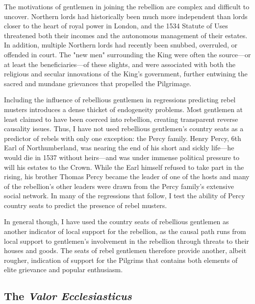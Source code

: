 \documentclass[12pt]{article}
\begin{document}
The motivations of gentlemen in joining the rebellion are complex and difficult to uncover. Northern lords had historically been much more independent than lords closer to the heart of royal power in London, and the 1534 Statute of Uses threatened both their incomes and the autonomous management of their estates.\autocite[27]{Fletcher2008} In addition, multiple Northern lords had recently been snubbed, overruled, or offended in court. The "new men" surrounding the King were often the source---or at least the beneficiaries---of these slights, and were associated with both the religious and secular innovations of the King's government, further entwining the sacred and mundane grievances that propelled the Pilgrimage.\autocite[69]{Bush1996}

Including the influence of rebellious gentlemen in regressions predicting rebel musters introduces a dense thicket of endogeneity problems. Most gentlemen at least claimed to have been coerced into rebellion, creating transparent reverse causality issues. Thus, I have not used rebellious gentlemen's country seats as a predictor of rebels with only one exception: the Percy family. Henry Percy, 6th Earl of Northumberland, was nearing the end of his short and sickly life---he would die in 1537 without heirs---and was under immense political pressure to will his estates to the Crown. While the Earl himself refused to take part in the rising, his brother Thomas Percy became the leader of one of the hosts and many of the rebellion's other leaders were drawn from the Percy family's extensive social network.\autocite[205-7]{Bush1996} In many of the regressions that follow, I test the ability of Percy country seats to predict the presence of rebel musters.

In general though, I have used the country seats of rebellious gentlemen as another indicator of local support for the rebellion, as the causal path runs from local support to gentlemen's involvement in the rebellion through threats to their houses and goods. The seats of rebel gentlemen therefore provide another, albeit rougher, indication of support for the Pilgrims that contains both elements of elite grievance and popular enthusiasm.

\subsection{The \emph{Valor Ecclesiasticus}}
\end{document}
